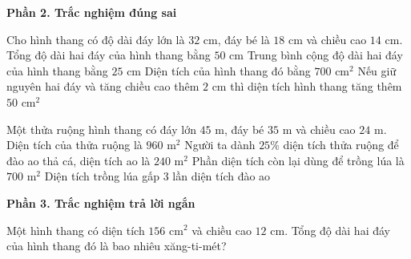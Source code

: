 \textbf{Phần 2. Trắc nghiệm đúng sai}

\begin{ex} %
Cho hình thang có độ dài đáy lớn là $32\text{ cm}$, đáy bé là $18\text{ cm}$ và chiều cao $14\text{ cm}$.
\choiceTF
{\True Tổng độ dài hai đáy của hình thang bằng $50\text{ cm}$}
{\True Trung bình cộng độ dài hai đáy của hình thang bằng $25\text{ cm}$}
{Diện tích của hình thang đó bằng $700\text{ cm}^2$}
{\True Nếu giữ nguyên hai đáy và tăng chiều cao thêm $2\text{ cm}$ thì diện tích hình thang tăng thêm $50\text{ cm}^2$}
\end{ex}

\begin{ex} %
Một thửa ruộng hình thang có đáy lớn $45\text{ m}$, đáy bé $35\text{ m}$ và chiều cao $24\text{ m}$.
\choiceTF
{\True Diện tích của thửa ruộng là $960\text{ m}^2$}
{\True Người ta dành $25\%$ diện tích thửa ruộng để đào ao thả cá, diện tích ao là $240\text{ m}^2$}
{Phần diện tích còn lại dùng để trồng lúa là $700\text{ m}^2$}
{\True Diện tích trồng lúa gấp 3 lần diện tích đào ao}
\end{ex}

\textbf{Phần 3. Trắc nghiệm trả lời ngắn}

\begin{ex} %
Một hình thang có diện tích $156\text{ cm}^2$ và chiều cao $12\text{ cm}$. Tổng độ dài hai đáy của hình thang đó là bao nhiêu xăng-ti-mét?
\end{ex}

